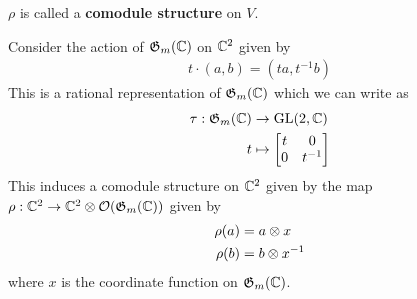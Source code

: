 \documentclass[12pt]{article}
\begin{document}
\begin{definition}
    $\rho$ is called a \textbf{comodule structure} on $V$.
\end{definition}

\begin{example}
    Consider the action of $\mathfrak{G}_m(\mathbb{C})$ on $\mathbb{C}^2$ given by
    \begin{align*}
        t\cdot (a,b) = (ta, t^{-1}b)
    \end{align*} This is a rational representation of $\mathfrak{G}_m(\mathbb{C})$ which we can write as 
    \begin{align*}
        \tau:\mathfrak{G}_m(\mathbb{C}) &\to \operatorname{GL}(2,\mathbb{C}) \\
        t &\mapsto \begin{bmatrix}
            t & 0 \\
            0 & {t}^{-1}
        \end{bmatrix}
    \end{align*} This induces a comodule structure on $\mathbb{C}^2$ given by the map $\rho: \mathbb{C}^2\to \mathbb{C}^2\otimes \mathcal{O}(\mathfrak{G}_m(\mathbb{C}))$ given by
    \begin{align*}
        \rho(a) &= a\otimes x \\
        \rho(b) &= b\otimes {x}^{-1}
    \end{align*} where $x$ is the coordinate function on $\mathfrak{G}_m(\mathbb{C})$.
\end{example}
\end{document}
